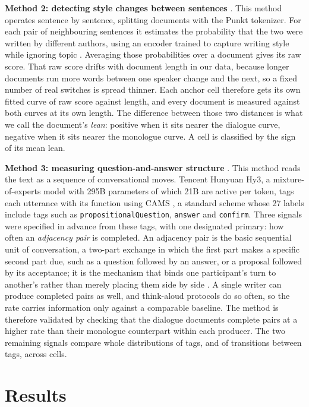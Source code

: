 \documentclass[10pt,twocolumn]{article}
\begin{document}
\textbf{Method 2: detecting style changes between sentences} \cite{schmidt2025}. This method
operates sentence by sentence, splitting documents with the Punkt tokenizer. For each pair of
neighbouring sentences it estimates the probability that the two were written by different authors,
using an encoder trained to capture writing style while ignoring topic \cite{patel2025}. Averaging
those probabilities over a document gives its raw score. That raw score drifts with document length
in our data, because longer documents run more words between one speaker change and the next, so a
fixed number of real switches is spread thinner. Each anchor cell therefore gets its own fitted curve
of raw score against length, and every document is measured against both curves at its own length.
The difference between those two distances is what we call the document's \emph{lean}: positive when
it sits nearer the dialogue curve, negative when it sits nearer the monologue curve. A cell is
classified by the sign of its mean lean.

\textbf{Method 3: measuring question-and-answer structure} \cite{schegloff1973}. This method reads
the text as a sequence of conversational moves. Tencent Hunyuan Hy3, a mixture-of-experts model with
295B parameters of which 21B are active per token, tags each utterance with its function using CAMS
\cite{duran2022}, a standard scheme whose 27 labels include tags such as
\texttt{propositionalQuestion}, \texttt{answer} and \texttt{confirm}. Three signals were specified in
advance from these tags, with one designated primary: how often an \emph{adjacency pair} is
completed. An adjacency pair is the basic sequential unit of conversation, a two-part exchange in
which the first part makes a specific second part due, such as a question followed by an answer, or a
proposal followed by its acceptance; it is the mechanism that binds one participant's turn to
another's rather than merely placing them side by side \cite{schegloff1973}. A single writer can
produce completed pairs as well, and think-aloud protocols do so often, so the rate carries
information only against a comparable baseline. The method is therefore validated by checking that
the dialogue documents complete pairs at a higher rate than their monologue counterpart within each
producer. The two remaining signals compare whole distributions of tags, and of transitions between
tags, across cells.

\section{Results}
\end{document}
